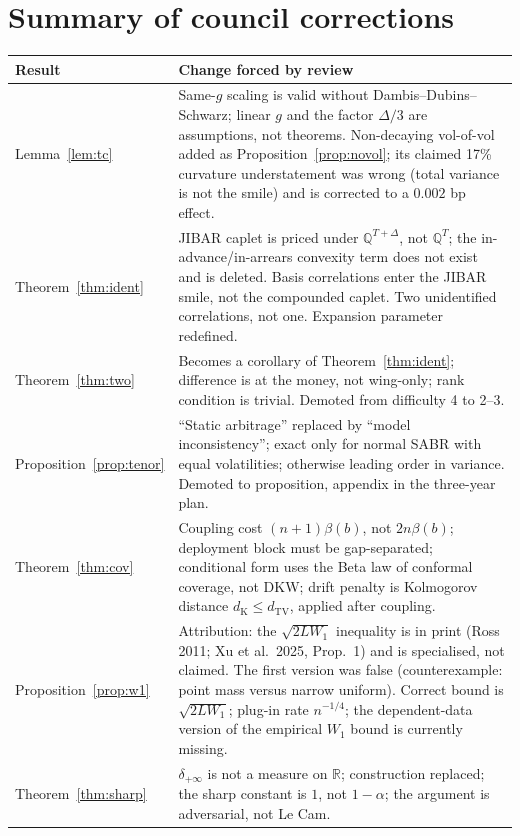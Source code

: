 \documentclass[11pt,a4paper]{article}
\theoremstyle{plain}
\theoremstyle{definition}
\theoremstyle{remark}
\newcommand{\Q}{\mathbb{Q}}
\newcommand{\R}{\mathbb{R}}
\newcommand{\dTV}{d_{\mathrm{TV}}}
\newcommand{\dK}{d_{\mathrm{K}}}
\begin{document}
\section*{Summary of council corrections}
\begin{center}\small
\begin{tabular}{@{}p{}p{}@{}}
\toprule
Result & Change forced by review \\
\midrule
Lemma~\ref{lem:tc} & Same-$g$ scaling is valid without Dambis--Dubins--Schwarz; linear $g$ and the factor $\Delta/3$ are assumptions, not theorems. Non-decaying vol-of-vol added as Proposition~\ref{prop:novol}; its claimed 17\% curvature understatement was wrong (total variance is not the smile) and is corrected to a $0.002$ bp effect. \\
Theorem~\ref{thm:ident} & JIBAR caplet is priced under $\Q^{T+\Delta}$, not $\Q^{T}$; the in-advance/in-arrears convexity term does not exist and is deleted. Basis correlations enter the JIBAR smile, not the compounded caplet. Two unidentified correlations, not one. Expansion parameter redefined. \\
Theorem~\ref{thm:two} & Becomes a corollary of Theorem~\ref{thm:ident}; difference is at the money, not wing-only; rank condition is trivial. Demoted from difficulty 4 to 2--3. \\
Proposition~\ref{prop:tenor} & ``Static arbitrage'' replaced by ``model inconsistency''; exact only for normal SABR with equal volatilities; otherwise leading order in variance. Demoted to proposition, appendix in the three-year plan. \\
Theorem~\ref{thm:cov} & Coupling cost $(n+1)\beta(b)$, not $2n\beta(b)$; deployment block must be gap-separated; conditional form uses the Beta law of conformal coverage, not DKW; drift penalty is Kolmogorov distance $\dK \le \dTV$, applied after coupling. \\
Proposition~\ref{prop:w1} & Attribution: the $\sqrt{2LW_1}$ inequality is in print (Ross 2011; Xu et al.\ 2025, Prop.\ 1) and is specialised, not claimed. The first version was false (counterexample: point mass versus narrow uniform). Correct bound is $\sqrt{2LW_1}$; plug-in rate $n^{-1/4}$; the dependent-data version of the empirical $W_1$ bound is currently missing. \\
Theorem~\ref{thm:sharp} & $\delta_{+\infty}$ is not a measure on $\R$; construction replaced; the sharp constant is $1$, not $1-\alpha$; the argument is adversarial, not Le Cam. \\

\end{tabular}
\end{center}
\end{document}
